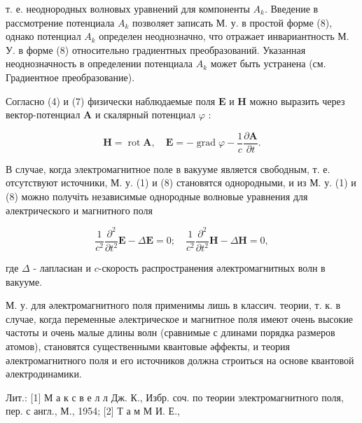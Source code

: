 \documentclass[10pt]{article}
\begin{document}
т. е. неоднородных волновых уравнений для компоненты $A_{k}$. Введение в рассмотрение потенциала $A_{k}$ позволяет записать М. у. в простой форме (8), однако потенциал $A_{k}$ определен неоднозначно, что отражает инвариантность М. У. в форме (8) относительно градиентных преобразований. Указанная неоднозначность в определении потенциала $A_{k}$ может быть устранена (см. Градиентное преобразование).



Согласно (4) и (7) физически наблюдаемые поля $\boldsymbol{E}$ и $\boldsymbol{H}$ можно выразить через вектор-потенциал $\boldsymbol{A}$ и скалярный потенциал $\varphi$ :



\[

\boldsymbol{H}=\operatorname{rot} \boldsymbol{A}, \quad \boldsymbol{E}=-\operatorname{grad} \varphi-\frac{1}{c} \frac{\partial \boldsymbol{A}}{\partial t} .

\]



В случае, когда электромагнитное поле в вакууме является свободным, т. е. отсутствуют источники, М. у. (1) и (8) становятся однородными, и из М. у. (1) и (8) можно получіть независимые однородные волновые уравнения для әлектрического и магнитного поля



\[

\frac{1}{c^{2}} \frac{\partial^{2}}{\partial t^{2}} \boldsymbol{E}-\Delta \boldsymbol{E}=0 ; \quad \frac{1}{c^{2}} \frac{\partial^{2}}{\partial t^{2}} \boldsymbol{H}-\Delta \boldsymbol{H}=0,

\]



где $\Delta$ - лапласиан и $c$-скорость распространения әлектромагнитных волн в вакууме.



М. у. для әлектромагнитного поля применимы лишь в классич. теории, т. к. в случае, когда переменные әлектрическое и магнитное поля имеют очень высокие частоты и очень малые длины волн (сравнимые с длинами порядка размеров атомов), становятся существенными квантовые әффекты, и теория әлектромагнитного поля и его источников должна строиться на основе квантовой әлектродинамики.



Лит.: [1] М а к с в е л л Дж. К., Избр. соч. по теории электромагнитного поля, пер. с англ., М., 1954; [2] Т а м М И. Е.,
\end{document}
